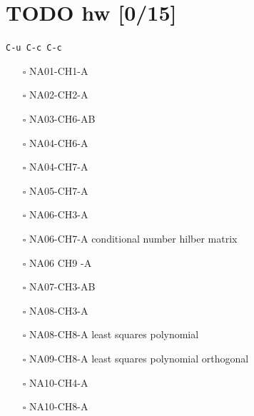 \documentclass[11pt]{article}
\begin{document}
\section{{\bfseries\sffamily TODO} hw [0/15]}
\label{sec:orgf5bc1b6}
\texttt{C-u C-c C-c}
\begin{itemize}
\item[{$\square$}] NA01-CH1-A
\item[{$\square$}] NA02-CH2-A
\item[{$\square$}] NA03-CH6-AB
\item[{$\square$}] NA04-CH6-A
\item[{$\square$}] NA04-CH7-A
\item[{$\square$}] NA05-CH7-A
\item[{$\square$}] NA06-CH3-A
\item[{$\square$}] NA06-CH7-A
conditional number
hilber matrix
\item[{$\square$}] NA06 CH9 -A
\item[{$\square$}] NA07-CH3-AB
\item[{$\square$}] NA08-CH3-A
\item[{$\square$}] NA08-CH8-A
least squares polynomial
\item[{$\square$}] NA09-CH8-A
least squares polynomial orthogonal
\item[{$\square$}] NA10-CH4-A
\item[{$\square$}] NA10-CH8-A
\end{itemize}
\end{document}
